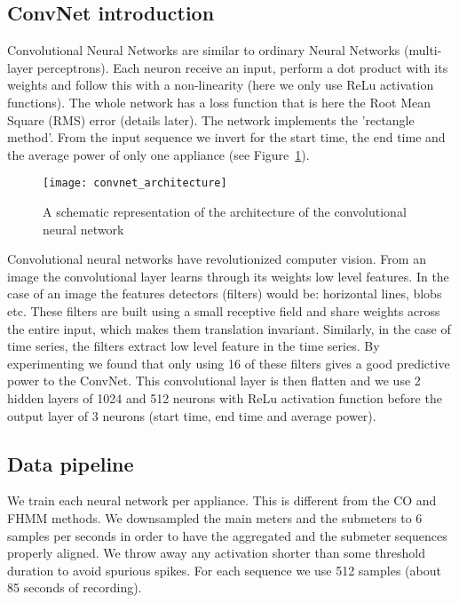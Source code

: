 \documentclass[10pt]{article}
\begin{document}
\subsection{ConvNet introduction}
Convolutional Neural Networks are similar to ordinary Neural Networks (multi-layer perceptrons). Each neuron receive an input, perform a dot product with its weights and follow this with a non-linearity (here we only use ReLu activation functions). The whole network has a loss function that is here the Root Mean Square (RMS) error (details later). The network implements the 'rectangle method'. From the input sequence we invert for the start time, the end time and the average power of only one appliance (see Figure~\ref{convnet_architecture}).

\begin{figure}
\begin{center}
\texttt{[image: convnet\_architecture]}
\caption{A schematic representation of the architecture of the convolutional neural network}
\label{convnet_architecture}
\end{center}
\end{figure}

Convolutional neural networks have revolutionized computer vision. From an image the convolutional layer learns through its weights low level features. In the case of an image the features detectors (filters) would be: horizontal lines, blobs etc. These filters are built using a small receptive field and share weights across the entire input, which makes them translation invariant. Similarly, in the case of time series, the filters extract low level feature in the time series. By experimenting we found that only using 16 of these filters gives a good predictive power to the ConvNet. This convolutional layer is then flatten and we use 2 hidden layers of 1024 and 512 neurons with ReLu activation function before the output layer of 3 neurons (start time, end time and average power).

\subsection{Data pipeline}


We train each neural network per appliance. This is different from the CO and FHMM methods. We downsampled  the main meters and the submeters to 6 samples per seconds in order to have the aggregated and the submeter sequences properly aligned. We throw away any activation shorter than some threshold duration to avoid spurious spikes. For each sequence we use 512 samples (about 85 seconds of recording).
\end{document}
